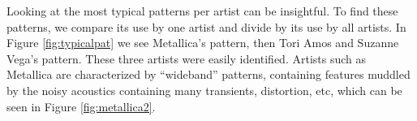 \documentclass{article}
\begin{document}
Looking at the most typical patterns per artist can be insightful.
To find these patterns, we compare its use by one artist and divide
by its use by all artists. In Figure \ref{fig:typicalpat} we see 
Metallica's pattern, then Tori Amos and
Suzanne Vega's pattern. These three artists were easily identified.
Artists such as Metallica are characterized by ``wideband'' patterns,
containing features muddled by the noisy acoustics containing many
transients,
distortion, etc, which can be seen in Figure \ref{fig:metallica2}.

\end{document}
